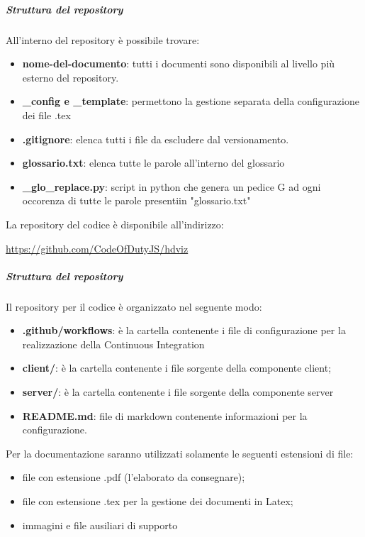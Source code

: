 			\subparagraph{Struttura del repository}
			All'interno del repository è possibile trovare:
			\begin{itemize}
				\item \textbf{nome-del-documento}: tutti i documenti sono disponibili al livello più esterno del repository.
				\item \textbf{\_config e \_template}: permettono la gestione separata della configurazione dei file .tex
				\item \textbf{.gitignore}: elenca tutti i file da escludere dal versionamento.
				\item \textbf{glossario.txt}: elenca tutte le parole all'interno del glossario
				\item \textbf{\_glo\_replace.py}: script in python che genera un pedice G ad ogni occorenza di tutte le parole presentiin "glossario.txt"
			\end{itemize}
			
			La repository del codice è disponibile all'indirizzo:\\
			\begin{center}
				\url{https://github.com/CodeOfDutyJS/hdviz}
			\end{center}

				\subparagraph{Struttura del repository}
				Il repository per il codice è organizzato nel seguente modo:
				\begin{itemize}
					\item \textbf{.github/workflows}: è la cartella contenente i file di configurazione per la realizzazione della Continuous Integration
					\item \textbf{client/}: è la cartella contenente i file sorgente della componente client;
					\item \textbf{server/}: è la cartella contenente i file sorgente della componente server
					\item \textbf{README.md}: file di markdown contenente informazioni per la configurazione.
				\end{itemize}
				
			Per la documentazione saranno utilizzati solamente le seguenti estensioni di file:
			\begin{itemize}
				\item file con estensione .pdf (l'elaborato da consegnare);
				\item file con estensione .tex per la gestione dei documenti in Latex;
				\item immagini e file ausiliari di supporto
			\end{itemize}
		

